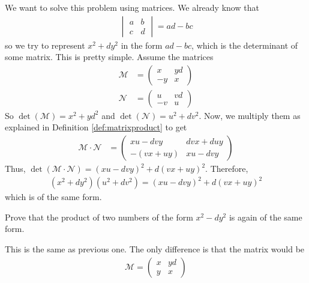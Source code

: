 \documentclass{subfile}
\begin{document}
\begin{solution}
We want to solve this problem using matrices. We already know that
	\begin{align*}
		\begin{vmatrix}
			a&b\\
			c&d
		\end{vmatrix} = ad-bc
	\end{align*}
so we try to represent $x^2+dy^2$ in the form $ad-bc$, which is the determinant of some matrix. This is pretty simple. Assume the matrices
	\begin{align*}
		\mathcal{M}
			& =
			\begin{pmatrix}
				x & yd\\
				-y & x
			\end{pmatrix}\\
		\mathcal{N}
			& =
			\begin{pmatrix}
				u & vd\\
				-v & u
			\end{pmatrix}
	\end{align*}
So $\det(\mathcal M)=x^2+yd^2$ and $\det(\mathcal{N})=u^2+dv^2$.
Now, we multiply them as explained in Definition \eqref{def:matrixproduct} to get
	\begin{align*}
		\mathcal{M}\cdot\mathcal{N}
			& =
			\begin{pmatrix}
				xu-dvy & dvx+duy\\
				-(vx+uy) & xu-dvy
			\end{pmatrix}
	\end{align*}
Thus, $\det(\mathcal{M \cdot N})=(xu-dvy)^2+d(vx+uy)^2$. Therefore,
\begin{align*}
(x^2+dy^2)(u^2+dv^2)=(xu-dvy)^2+d(vx+uy)^2
\end{align*}
which is of the same form.
\end{solution}

\begin{problem}
Prove that the product of two numbers of the form $x^2-dy^2$ is again of the same form.
\end{problem}

\begin{solution}
This is the same as previous one. The only difference is that the matrix would be
\begin{align*}
\mathcal{M}=\begin{pmatrix}
x & yd\\
y & x
\end{pmatrix}
\end{align*}
\end{solution}
\end{document}
